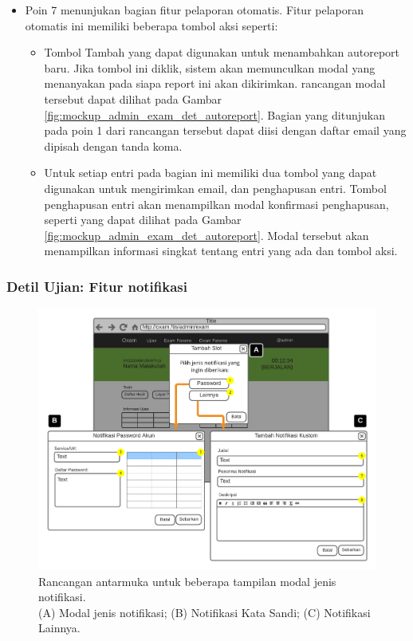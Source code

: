 \begin{itemize}
        \item Poin 7 menunjukan bagian fitur pelaporan otomatis. Fitur pelaporan
            otomatis ini memiliki beberapa tombol aksi seperti:
           \begin{itemize}
               \item Tombol Tambah yang dapat digunakan untuk menambahkan
                    autoreport baru. Jika tombol ini diklik, sistem akan
                    memunculkan modal yang menanyakan pada siapa report ini akan
                    dikirimkan. rancangan modal tersebut dapat dilihat pada
                    Gambar \ref{fig:mockup_admin_exam_det_autoreport}. Bagian
                    yang ditunjukan pada poin 1 dari rancangan tersebut dapat
                    diisi dengan daftar email yang dipisah dengan tanda koma.
                    
                \item Untuk setiap entri pada bagian ini memiliki dua tombol
                    yang dapat digunakan untuk mengirimkan email, dan
                    penghapusan entri. Tombol penghapusan entri akan menampilkan modal
                    konfirmasi penghapusan, seperti yang dapat dilihat pada Gambar
                    \ref{fig:mockup_admin_exam_det_autoreport}. Modal tersebut
                    akan menampilkan informasi singkat tentang entri yang ada
                    dan tombol aksi.
           \end{itemize}
    \end{itemize}
    
\subsubsection{Detil Ujian: Fitur notifikasi}
    \begin{figure}
        \centering
        \includegraphics{Gambar/mockups/Mockup--Admin - Notif.pdf}
        \caption{Rancangan antarmuka untuk beberapa tampilan modal jenis
        notifikasi. \\
            (A) Modal jenis notifikasi; (B) Notifikasi Kata Sandi; (C)
            Notifikasi Lainnya.}
        \label{fig:mockup_admin_exam_det_notif}
    \end{figure}
    
